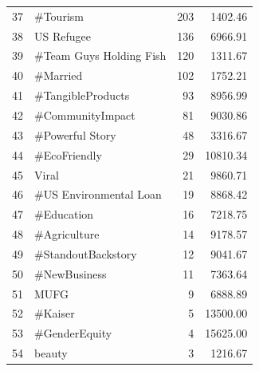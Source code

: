 \begin{longtable}{|c|l|r|r|}
	37          & \#Tourism                        & 203                    & 1402.46                      \\
	38          & US Refugee                       & 136                    & 6966.91                      \\
	39          & \#Team Guys Holding Fish         & 120                    & 1311.67                      \\
	40          & \#Married                        & 102                    & 1752.21                      \\
	41          & \#TangibleProducts               & 93                     & 8956.99                      \\
	42          & \#CommunityImpact                & 81                     & 9030.86                      \\
	43          & \#Powerful Story                 & 48                     & 3316.67                      \\
	44          & \#EcoFriendly                    & 29                     & 10810.34                     \\
	45          & Viral                            & 21                     & 9860.71                      \\
	46          & \#US Environmental Loan          & 19                     & 8868.42                      \\
	47          & \#Education                      & 16                     & 7218.75                      \\
	48          & \#Agriculture                    & 14                     & 9178.57                      \\
	49          & \#StandoutBackstory              & 12                     & 9041.67                      \\
	50          & \#NewBusiness                    & 11                     & 7363.64                      \\
	51          & MUFG                             & 9                      & 6888.89                      \\
	52          & \#Kaiser                         & 5                      & 13500.00                     \\
	53          & \#GenderEquity                   & 4                      & 15625.00                     \\
	54          & beauty                           & 3                      & 1216.67                      \\

\end{longtable}
